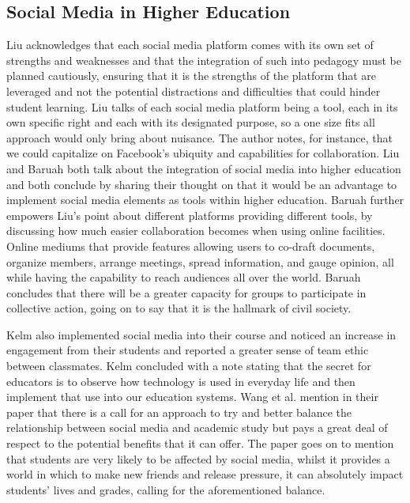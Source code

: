 \documentclass[lettersize,journal]{IEEEtran}
\begin{document}
\subsection{Social Media in Higher Education}
    Liu \cite{Liu2010}  acknowledges that each social media platform comes with
    its own set of strengths and weaknesses and that the integration of such into
    pedagogy must be planned cautiously, ensuring that it is the strengths of the platform
    that are leveraged and not the potential distractions and difficulties that could
    hinder student learning. Liu talks of each social media platform being a tool,
    each in its own specific right and each with its designated purpose, so a one size
    fits all approach would only bring about nuisance. The author notes, for instance,
    that we could capitalize on Facebook's ubiquity and capabilities for collaboration.
    Liu \cite{Liu2010} and Baruah \cite{Baruah2012} both talk about the integration of
    social media into higher education and both conclude by sharing their thought on that
    it would be an advantage to implement social media elements as tools within higher
    education. Baruah further empowers Liu's point about different platforms providing
    different tools, by discussing how much easier collaboration becomes when using
    online facilities. Online mediums that provide features allowing users to co-draft
    documents, organize members, arrange meetings, spread information, and gauge opinion,
    all while having the capability to reach audiences all over the world.
    Baruah concludes that there will be a greater capacity for groups to participate in
    collective action, going on to say that it is the hallmark of civil society.

    Kelm \cite{Kelm2011} also implemented social media into their course and noticed an
    increase in engagement from their students and reported a greater sense of team ethic
    between classmates. Kelm concluded with a note stating that the secret for educators is
    to observe how technology is used in everyday life and then implement that use into
    our education systems.
    Wang et al. \cite{Wang2011} mention in their paper that there is a call for an approach
    to try and better balance the relationship between social media and academic study but
    pays a great deal of respect to the potential benefits that it can offer. The paper goes
    on to mention that students are very likely to be affected by social media, whilst it
    provides a world in which to make new friends and release pressure, it can absolutely
    impact students' lives and grades, calling for the aforementioned balance.
\end{document}
